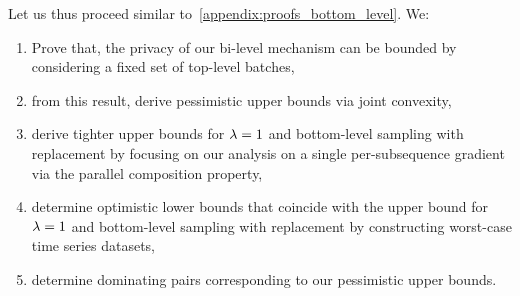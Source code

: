 Let us thus proceed similar to~\cref{appendix:proofs_bottom_level}. We: 
\begin{enumerate}
    \item Prove that, the privacy of our bi-level mechanism can be bounded by considering a fixed set of top-level batches,
    \item from this result, derive pessimistic upper bounds  via joint convexity,
    \item derive tighter upper bounds for $\lambda = 1$ and bottom-level sampling with replacement by focusing on our analysis on a single per-subsequence gradient via the parallel composition property, 
    \item determine optimistic lower bounds that coincide with the upper bound for $\lambda=1$ and bottom-level sampling with replacement by constructing worst-case time series datasets,
    \item determine dominating pairs corresponding to our pessimistic upper bounds.
\end{enumerate}

